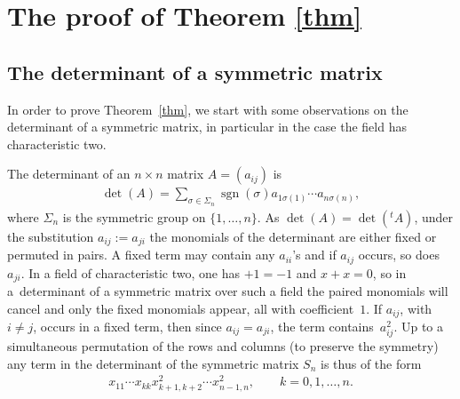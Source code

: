 \documentclass[10pt,a4paper]{amsart}
\numberwithin{equation}{section}
\begin{document}
\section{The proof of Theorem \ref{thm}} \label{secthm}

\subsection{The determinant of a symmetric matrix}\label{termsn}
In order to prove Theorem~\ref{thm}, we start with some observations on the determinant of a symmetric matrix, in particular in the case the field has characteristic two.

The determinant of an $n\times n$ matrix $A=(a_{ij})$ is
\begin{gather*}
\det(A) = \sum_{\sigma\in\Sigma_n}\operatorname{sgn}(\sigma) a_{1\sigma(1)}\cdots a_{n\sigma(n)},
\end{gather*}
where $\Sigma_n$ is the symmetric group on $\{1,\ldots,n\}$. As $\det(A)=\det({}^tA)$, under the substitution $a_{ij}:=a_{ji}$ the monomials of the determinant are either fixed or permuted in pairs. A fixed term may contain any $a_{ii}$'s and if $a_{ij}$ occurs, so does $a_{ji}$. In a field of characteristic two, one has $+1=-1$ and $x+x=0$, so in a~determinant of a symmetric matrix over such a field the paired monomials will cancel and only the fixed monomials appear, all with coefficient~$1$. If $a_{ij}$, with $i\ne j$, occurs in a fixed term, then since $a_{ij}=a_{ji}$, the term contains~$a_{ij}^2$. Up to a simultaneous permutation of the rows and columns (to preserve the symmetry) any term in the determinant of the symmetric matrix $S_n$ is thus of the form
\begin{gather*}
x_{11}\cdots x_{kk}x_{k+1,k+2}^2\cdots x_{n-1,n}^2,\qquad k=0,1,\ldots, n .
\end{gather*}
\end{document}
